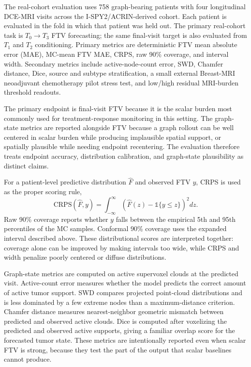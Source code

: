 \documentclass[journal,twoside,print]{ieeecolor}
\newcommand{\Tzero}{\ensuremath{T_0}}
\newcommand{\Tone}{\ensuremath{T_1}}
\newcommand{\Ttwo}{\ensuremath{T_2}}
\newcommand{\Tthree}{\ensuremath{T_3}}
\begin{document}
The real-cohort evaluation uses 758 graph-bearing patients with four
longitudinal DCE-MRI visits across the I-SPY2/ACRIN-derived cohort. Each
patient is evaluated in the fold in which that patient was held out. The
primary real-cohort task is \Tzero$\rightarrow$\Tthree{} FTV forecasting; the
same final-visit target is also evaluated from \Tone{} and \Ttwo{} conditioning.
Primary metrics are deterministic FTV mean absolute error (MAE), MC-mean FTV
MAE, CRPS, raw 90\% coverage, and interval width. Secondary metrics include
active-node-count error, SWD, Chamfer distance, Dice, source and subtype
stratification, a small external Breast-MRI neoadjuvant chemotherapy pilot
stress test, and low/high residual MRI-burden threshold readouts.

The primary endpoint is final-visit FTV because it is the scalar burden most
commonly used for treatment-response monitoring in this setting. The graph-state
metrics are reported alongside FTV because a graph rollout can be well centered
in scalar burden while producing implausible spatial support, or spatially
plausible while needing endpoint recentering. The evaluation therefore treats
endpoint accuracy, distribution calibration, and graph-state plausibility as
distinct claims.

For a patient-level predictive distribution $\widehat{F}$ and observed FTV
$y$, CRPS is used as the proper scoring rule,
\begin{equation}
\mathrm{CRPS}(\widehat{F},y)=
\int_{-\infty}^{\infty}
\left(\widehat{F}(z)-\mathbb{1}\{y\leq z\}\right)^2 dz .
\end{equation}
Raw 90\% coverage reports whether $y$ falls between the empirical 5th and 95th
percentiles of the MC samples. Conformal 90\% coverage uses the expanded
interval described above. These distributional scores are interpreted together:
coverage alone can be improved by making intervals too wide, while CRPS and
width penalize poorly centered or diffuse distributions.

Graph-state metrics are computed on active supervoxel clouds at the predicted
visit. Active-count error measures whether the model predicts the correct amount
of active tumor support. SWD compares projected point-cloud distributions and is
less dominated by a few extreme nodes than a maximum-distance criterion.
Chamfer distance measures nearest-neighbor geometric mismatch between predicted
and observed active clouds. Dice is computed after voxelizing the predicted and
observed active supports, giving a familiar overlap score for the forecasted
tumor state. These metrics are intentionally reported even when scalar FTV is
strong, because they test the part of the output that scalar baselines cannot
produce.
\end{document}
